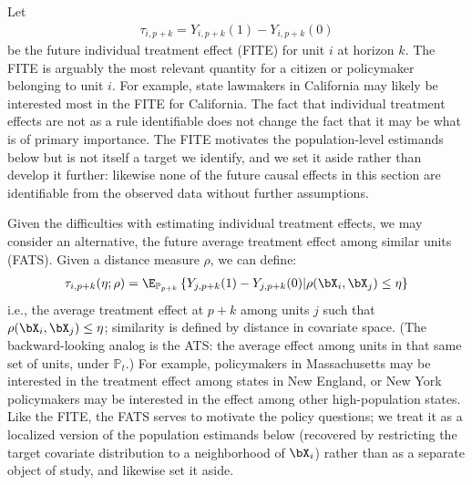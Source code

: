 \documentclass{article}
\renewcommand{\P}{\mathbb{P}}
\begin{document}
Let 
\begin{align*}
    \tau_{i,p+k} = Y_{i,p+k}(1) - Y_{i,p+k}(0)
\end{align*} 
be the future individual treatment effect (FITE) for unit $i$ at horizon $k$. The FITE is arguably the most relevant quantity for a citizen or policymaker belonging to unit $i$. For example, state lawmakers in California may likely be interested most in the FITE for California. The fact that individual treatment effects are not as a rule identifiable does not change the fact that it may be what is of primary importance. The FITE motivates the population-level estimands below but is not itself a target we identify, and we set it aside rather than develop it further: likewise none of the future causal effects in this section are identifiable from the observed data without further assumptions.

Given the difficulties with estimating individual treatment effects, we may consider an alternative, the future average treatment effect among similar units (FATS). Given a distance measure $\rho$, we can define:
\begin{align*}
    \tau_{i,p+k}(\eta; \rho) = \E_{\P_{p+k}}\left\{Y_{j,p+k}(1) - Y_{j,p+k}(0) | \rho(\bX_i, \bX_j) \leq \eta \right\}
\end{align*} 
i.e., the average treatment effect at $p+k$ among units $j$ such that $\rho(\bX_i, \bX_j) \leq \eta$; similarity is defined by distance in covariate space. (The backward-looking analog is the ATS: the average effect among units in that same set of units, under $\P_t$.) For example, policymakers in Massachusetts may be interested in the treatment effect among states in New England, or New York policymakers may be interested in the effect among other high-population states. Like the FITE, the FATS serves to motivate the policy questions; we treat it as a localized version of the population estimands below (recovered by restricting the target covariate distribution to a neighborhood of $\bX_i$) rather than as a separate object of study, and likewise set it aside.
\end{document}

